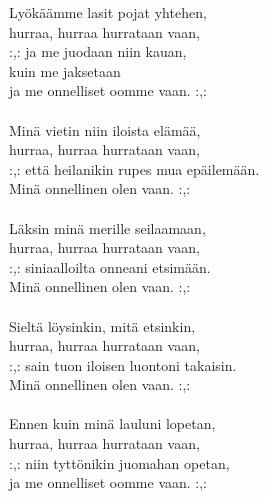 
 Lyökäämme lasit pojat yhtehen, \\ hurraa, hurraa hurrataan vaan, \\ :,: ja me juodaan niin kauan,  \\ kuin me jaksetaan \\ ja me onnelliset oomme vaan. :,: \\ \hspace{10mm} \\ Minä vietin niin iloista elämää, \\ hurraa, hurraa hurrataan vaan, \\ :,: että heilanikin rupes mua epäilemään. \\ Minä onnellinen olen vaan. :,: \\ \hspace{10mm} \\ Läksin minä merille seilaamaan, \\ hurraa, hurraa hurrataan vaan, \\ :,: siniaalloilta onneani etsimään. \\ Minä onnellinen olen vaan. :,: \\ \hspace{10mm} \\ Sieltä löysinkin, mitä etsinkin, \\ hurraa, hurraa hurrataan vaan, \\ :,: sain tuon iloisen luontoni takaisin. \\ Minä onnellinen olen vaan. :,: \\ \hspace{10mm} \\ Ennen kuin minä lauluni lopetan, \\ hurraa, hurraa hurrataan vaan, \\ :,: niin tyttönikin juomahan opetan, \\ ja me onnelliset oomme vaan. :,: 